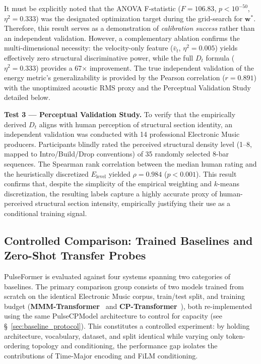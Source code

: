 \documentclass[pdflatex,sn-mathphys-num,twocolumn]{sn-jnl}
\theoremstyle{thmstyleone}
\theoremstyle{thmstyletwo}
\begin{document}
It must be explicitly noted that the ANOVA F-statistic ($F=106.83$, $p < 10^{-50}$, $\eta^2 = 0.333$) was the designated optimization target during the grid-search for $\boldsymbol{w}^*$. Therefore, this result serves as a demonstration of \emph{calibration success} rather than an independent validation. However, a complementary ablation confirms the multi-dimensional necessity: the velocity-only feature ($\bar{v}_t$, $\eta^2=0.005$) yields effectively zero structural discriminative power, while the full $D_t$ formula ($\eta^2=0.333$) provides a 67$\times$ improvement. The true independent validation of the energy metric's generalizability is provided by the Pearson correlation ($r=0.891$) with the unoptimized acoustic RMS proxy and the Perceptual Validation Study detailed below.

\textbf{Test 3 --- Perceptual Validation Study.}
To verify that the empirically derived $D_t$ aligns with human perception of structural section identity, an independent validation was conducted with 14 professional Electronic Music producers. Participants blindly rated the perceived structural density level (1--8, mapped to Intro/Build/Drop conventions) of 35 randomly selected 8-bar sequences. The Spearman rank correlation between the median human rating and the heuristically discretized $E_{\mathrm{level}}$ yielded $\rho = 0.984$ ($p < 0.001$). This result confirms that, despite the simplicity of the empirical weighting and $k$-means discretization, the resulting labels capture a highly accurate proxy of human-perceived structural section intensity, empirically justifying their use as a conditional training signal.

\subsection{Controlled Comparison: Trained Baselines and Zero-Shot Transfer Probes}
\label{sec:sota}
PulseFormer is evaluated against four systems spanning two categories of baselines. The primary comparison group consists of two models trained from scratch on the identical Electronic Music corpus, train/test split, and training budget (\textbf{MMM-Transformer}~\cite{ens2020mmm} and \textbf{CP-Transformer}~\cite{hsiao2021compound}), both re-implemented using the same PulseCPModel architecture to control for capacity (see \S~\ref{sec:baseline_protocol}). This constitutes a controlled experiment: by holding architecture, vocabulary, dataset, and split identical while varying only token-ordering topology and conditioning, the performance gap isolates the contributions of Time-Major encoding and FiLM conditioning.
\end{document}
